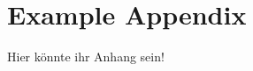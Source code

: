 \graphicspath{{Appendix/Figs/example/}}
\chapter{Example Appendix}
\label{app-grafic}

Hier könnte ihr Anhang sein!

